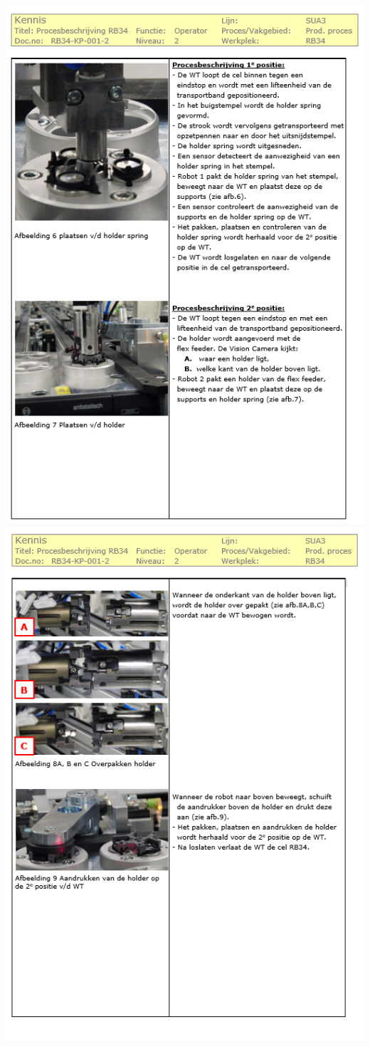 \includegraphics[width=\textwidth]{Figures/proces4}
\includegraphics[width=\textwidth]{Figures/proces5}

